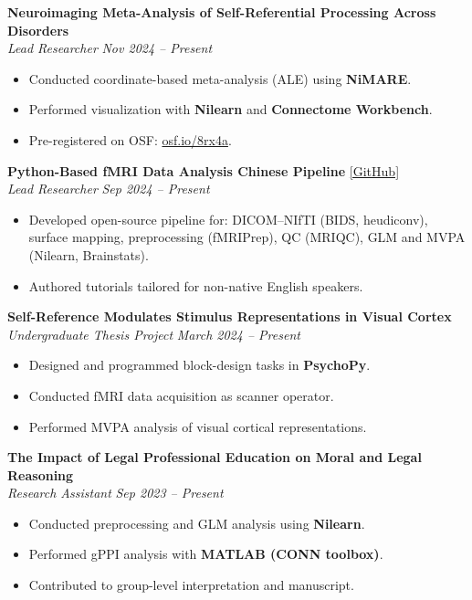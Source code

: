 \documentclass[10pt,a4paper]{article}
\begin{document}
\textbf{Neuroimaging Meta-Analysis of Self-Referential Processing Across Disorders} \\
\textit{Lead Researcher} \hfill \textit{Nov 2024 – Present}
\begin{itemize}
    \item Conducted coordinate-based meta-analysis (ALE) using \textbf{NiMARE}.
    \item Performed visualization with \textbf{Nilearn} and \textbf{Connectome Workbench}.
    \item Pre-registered on OSF: \href{https://osf.io/8rx4a/}{osf.io/8rx4a}.
\end{itemize}

\textbf{Python-Based fMRI Data Analysis Chinese Pipeline} \hfill \href{https://github.com/shanshan717/fMRI_Pipeline.git}{[GitHub]} \\
\textit{Lead Researcher} \hfill \textit{Sep 2024 – Present}
\begin{itemize}
    \item Developed open-source pipeline for: DICOM–NIfTI (BIDS, heudiconv), surface mapping, preprocessing (fMRIPrep), QC (MRIQC), GLM and MVPA (Nilearn, Brainstats).
    \item Authored tutorials tailored for non-native English speakers.
\end{itemize}

\textbf{Self-Reference Modulates Stimulus Representations in Visual Cortex} \\
\textit{Undergraduate Thesis Project} \hfill \textit{March 2024 – Present}
\begin{itemize}
    \item Designed and programmed block-design tasks in \textbf{PsychoPy}.
    \item Conducted fMRI data acquisition as scanner operator.
    \item Performed MVPA analysis of visual cortical representations.
\end{itemize}

\textbf{The Impact of Legal Professional Education on Moral and Legal Reasoning} \\
\textit{Research Assistant} \hfill \textit{Sep 2023 – Present}
\begin{itemize}
    \item Conducted preprocessing and GLM analysis using \textbf{Nilearn}.
    \item Performed gPPI analysis with \textbf{MATLAB (CONN toolbox)}.
    \item Contributed to group-level interpretation and manuscript.
\end{itemize}
\end{document}
